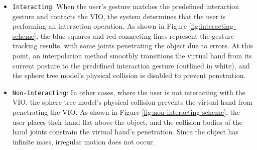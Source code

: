 \documentclass[runningheads]{llncs}
\begin{document}
\begin{itemize}
  \item {\texttt{Interacting}}: When the user's gesture matches the predefined interaction gesture and contacts the VIO, the system determines that the user is performing an interaction operation. As shown in Figure \ref{fig:interacting-scheme}, the blue squares and red connecting lines represent the gesture-tracking results, with some joints penetrating the object due to errors. At this point, an interpolation method smoothly transitions the virtual hand from its current posture to the predefined interaction gesture (outlined in white), and the sphere tree model's physical collision is disabled to prevent penetration.

  \item {\texttt{Non-Interacting}}: In other cases, where the user is not interacting with the VIO, the sphere tree model's physical collision prevents the virtual hand from penetrating the VIO. As shown in Figure \ref{fig:non-interacting-scheme}, the user places their hand flat above the object, and the collision bodies of the hand joints constrain the virtual hand's penetration. Since the object has infinite mass, irregular motion does not occur.
\end{itemize}
\end{document}
